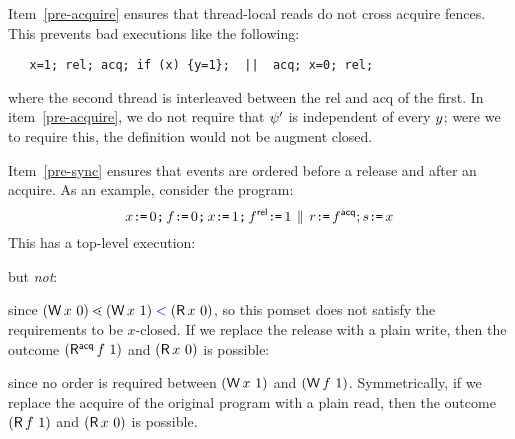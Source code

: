 
Item~\ref{pre-acquire} ensures that thread-local reads do
not cross acquire fences.  This prevents bad executions like the following:
\begin{verbatim}
   x=1; rel; acq; if (x) {y=1};  ||  acq; x=0; rel; 
\end{verbatim}
where the second thread is interleaved between the rel and acq of the first.
In item~\ref{pre-acquire}, we do not require that $\psi'$ is independent of
every $y$; were we to require this, the definition would not be augment closed.

Item~\ref{pre-sync} ensures that events are ordered before a release and
after an acquire.  As an example, consider the program:
\[
  x\texttt{:}\mkern-1mu\texttt{=}\,0\texttt{;}\, f\texttt{:}\mkern-1mu\texttt{=}\,0\texttt{;}\, x\texttt{:}\mkern-1mu\texttt{=}\, 1\texttt{;}\, f ^{\mathsf{rel}}\texttt{:}\mkern-1mu\texttt{=}\,1 \,\mathbin{\|}\, r\texttt{:}\mkern-1mu\texttt{=}\, f^{\mathsf{acq}}; s\texttt{:}\mkern-1mu\texttt{=}\, x
\]
This has a top-level execution:
\begin{tikzdisplay}[node distance=1em]
\end{tikzdisplay}
but \emph{not}:
\begin{tikzdisplay}[node distance=1em]
\end{tikzdisplay}
since $(\DW x0) \gtN (\DW x1) \lt (\DR x0)$, so this pomset does not satisfy the
requirements to be $x$-closed.
If we replace the release
with a plain write, then the outcome $(\DRAcq f1)$ and $(\DR x0)$ is possible:
\begin{tikzdisplay}[node distance=1em]
\end{tikzdisplay}
since no order is required between $(\DW x1)$ and $(\DW f1)$.  
Symmetrically, if we replace the acquire of the original program
with a plain read, then the outcome $(\DR f1)$ and $(\DR x0)$ is possible.

